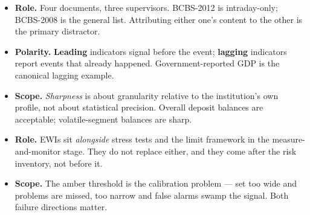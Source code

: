 \begin{lrtrapbox}
\begin{itemize}
\item \textbf{Role.} Four documents, three supervisors. BCBS-2012 is intraday-only; BCBS-2008 is the general list. Attributing either one's content to the other is the primary distractor.
\item \textbf{Polarity.} \textbf{Leading} indicators signal before the event; \textbf{lagging} indicators report events that already happened. Government-reported GDP is the canonical lagging example.
\item \textbf{Scope.} \emph{Sharpness} is about granularity relative to the institution's own profile, not about statistical precision. Overall deposit balances are acceptable; volatile-segment balances are sharp.
\item \textbf{Role.} EWIs sit \emph{alongside} stress tests and the limit framework in the measure-and-monitor stage. They do not replace either, and they come after the risk inventory, not before it.
\item \textbf{Scope.} The amber threshold is the calibration problem — set too wide and problems are missed, too narrow and false alarms swamp the signal. Both failure directions matter.
\end{itemize}
\end{lrtrapbox}
